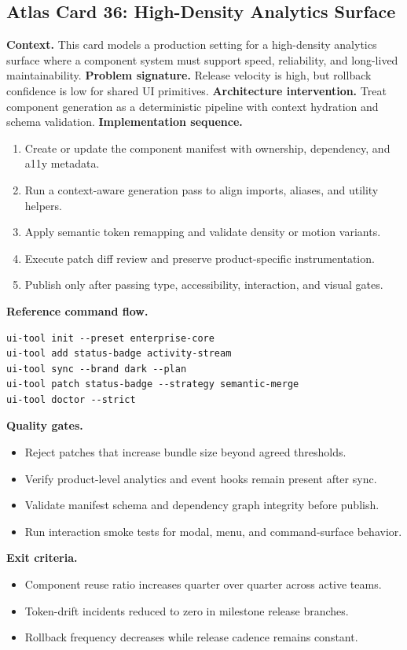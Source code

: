 \subsection*{Atlas Card 36: High-Density Analytics Surface}
\textbf{Context.} This card models a production setting for a high-density analytics surface where a component system must support speed, reliability, and long-lived maintainability.
\textbf{Problem signature.} Release velocity is high, but rollback confidence is low for shared UI primitives.
\textbf{Architecture intervention.} Treat component generation as a deterministic pipeline with context hydration and schema validation.
\textbf{Implementation sequence.}
\begin{enumerate}[leftmargin=*, itemsep=0.28em]
  \item Create or update the component manifest with ownership, dependency, and a11y metadata.
  \item Run a context-aware generation pass to align imports, aliases, and utility helpers.
  \item Apply semantic token remapping and validate density or motion variants.
  \item Execute patch diff review and preserve product-specific instrumentation.
  \item Publish only after passing type, accessibility, interaction, and visual gates.
\end{enumerate}
\textbf{Reference command flow.}
\begin{verbatim}
ui-tool init --preset enterprise-core
ui-tool add status-badge activity-stream
ui-tool sync --brand dark --plan
ui-tool patch status-badge --strategy semantic-merge
ui-tool doctor --strict
\end{verbatim}
\textbf{Quality gates.}
\begin{itemize}[leftmargin=*, itemsep=0.24em]
  \item Reject patches that increase bundle size beyond agreed thresholds.
  \item Verify product-level analytics and event hooks remain present after sync.
  \item Validate manifest schema and dependency graph integrity before publish.
  \item Run interaction smoke tests for modal, menu, and command-surface behavior.
\end{itemize}
\textbf{Exit criteria.}
\begin{itemize}[leftmargin=*, itemsep=0.24em]
  \item Component reuse ratio increases quarter over quarter across active teams.
  \item Token-drift incidents reduced to zero in milestone release branches.
  \item Rollback frequency decreases while release cadence remains constant.
\end{itemize}
\clearpage
